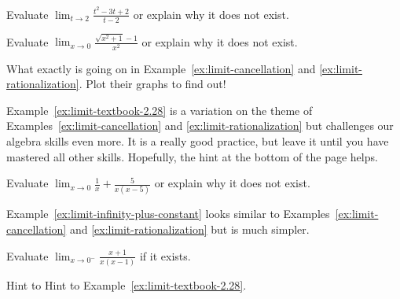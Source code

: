 \documentclass[../main.tex]{subfiles}
\begin{document}
\begin{example} \label{ex:limit-cancellation}
  Evaluate \(\lim_{t \to 2} \frac{t^{2} - 3t + 2}{t - 2}\) or explain why it does not exist.

\end{example}

\begin{example} \label{ex:limit-rationalization}
  Evaluate \(\lim_{x \to 0} \frac{\sqrt{x^{2}+1}-1}{x^{2}}\) or explain why it does not exist.

\end{example}

\faComment{} What exactly is going on in Example~\ref{ex:limit-cancellation} and \ref{ex:limit-rationalization}. Plot their graphs to find out!
\clearpage

Example~\ref{ex:limit-textbook-2.28} is a variation on the theme of Examples~\ref{ex:limit-cancellation} and \ref{ex:limit-rationalization} but challenges our algebra skills even more. It is a really good practice, but leave it until you have mastered all other skills. Hopefully, the hint at the bottom of the page helps.
\begin{example} \label{ex:limit-textbook-2.28}
  Evaluate \(\lim_{x \to 0} \frac{1}{x} + \frac{5}{x(x-5)}\) or explain why it does not exist.

\end{example}

Example~\ref{ex:limit-infinity-plus-constant} looks similar to Examples~\ref{ex:limit-cancellation} and \ref{ex:limit-rationalization} but is much simpler.
\begin{example} \label{ex:limit-infinity-plus-constant}
  Evaluate \(\lim_{x \to 0^{-}} \frac{x+1}{x(x-1)}\) if it exists.

\end{example}

\vfill{}
{\scriptsize Hint to Hint to Example~\ref{ex:limit-textbook-2.28}}. \newline
{}
\clearpage
\end{document}

